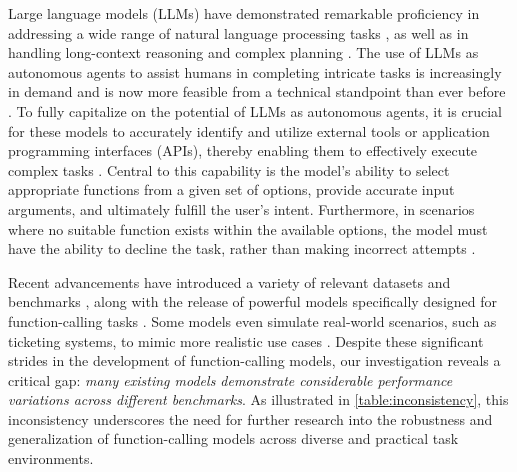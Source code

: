 \documentclass{article}
\begin{document}
Large language models (LLMs) have demonstrated remarkable proficiency in addressing a wide range of natural language processing tasks \citep{chowdhary2020natural}, as well as in handling long-context reasoning and complex planning \citep{wen2024reinforcing}. The use of LLMs as autonomous agents to assist humans in completing intricate tasks is increasingly in demand and is now more feasible from a technical standpoint than ever before \citep{gunter2024appleintelligencefoundationlanguage}. To fully capitalize on the potential of LLMs as autonomous agents, it is crucial for these models to accurately identify and utilize external tools or application programming interfaces (APIs), thereby enabling them to effectively execute complex tasks \citep{abdelaziz2024granite, patil2023gorilla}. Central to this capability is the model’s ability to select appropriate functions from a given set of options, provide accurate input arguments, and ultimately fulfill the user’s intent. Furthermore, in scenarios where no suitable function exists within the available options, the model must have the ability to decline the task, rather than making incorrect attempts \citep{patil2023gorilla}.

Recent advancements have introduced a variety of relevant datasets and benchmarks \citep{li2023apibankcomprehensivebenchmarktoolaugmented, wu2024sealtoolsselfinstructtoollearning}, along with the release of powerful models specifically designed for function-calling tasks \citep{zhang2024xlamfamilylargeaction, patil2023gorilla, abdelaziz2024granite}. Some models even simulate real-world scenarios, such as ticketing systems, to mimic more realistic use cases \citep{yao2024taubenchbenchmarktoolagentuserinteraction, chen2024travelagentaiassistantpersonalized}. Despite these significant strides in the development of function-calling models, our investigation reveals a critical gap: \textit{many existing models demonstrate considerable performance variations across different benchmarks}. As illustrated in \autoref{table:inconsistency}, this inconsistency underscores the need for further research into the robustness and generalization of function-calling models across diverse and practical task environments.
\end{document}
